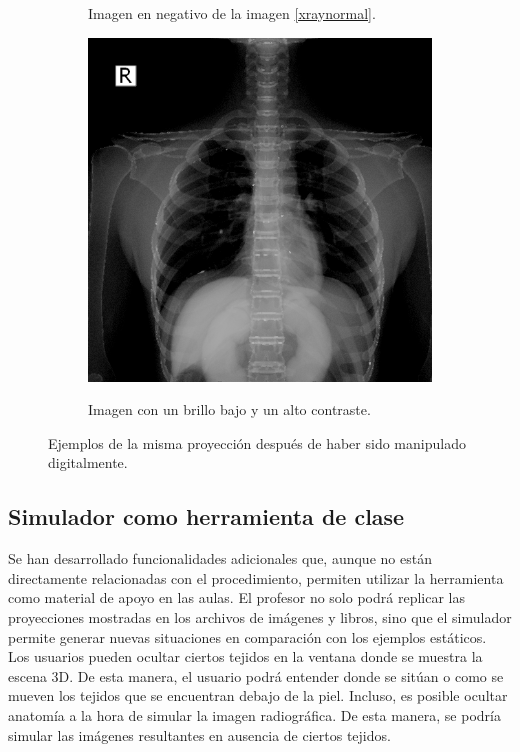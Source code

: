 \begin{figure}[ht]
\begin{subfigure}[b]{0.3\linewidth}
        \caption{Imagen en negativo de la imagen \ref{xraynormal}.}
    \end{subfigure}
    \null\hfill
     \begin{subfigure}[b]{0.3\linewidth}
        \centering
        {\includegraphics[width=\linewidth]{IMG/XRayMaleFilter2.png}}
        \caption{Imagen con un brillo bajo y un alto contraste.}
    \end{subfigure}
    \caption{\label{fig:imgmani}  Ejemplos de la misma proyección después de haber sido manipulado digitalmente.}
   \end{figure}



\subsection{Simulador como herramienta de clase}
\label{xray:sim}

Se han desarrollado funcionalidades adicionales que, aunque no están directamente relacionadas con el procedimiento, permiten utilizar la herramienta como material de apoyo en las aulas. El profesor no solo podrá replicar las proyecciones mostradas en los archivos de imágenes y libros, sino que el simulador permite generar nuevas situaciones en comparación con los ejemplos estáticos.  %
Los usuarios pueden ocultar ciertos tejidos en la ventana donde se muestra la escena 3D. De esta manera, el usuario podrá entender donde se sitúan o como se mueven los tejidos que se encuentran debajo de la piel. Incluso, es posible ocultar anatomía a la hora de simular la imagen radiográfica. De esta manera, se podría simular las imágenes resultantes en ausencia de ciertos tejidos. 

